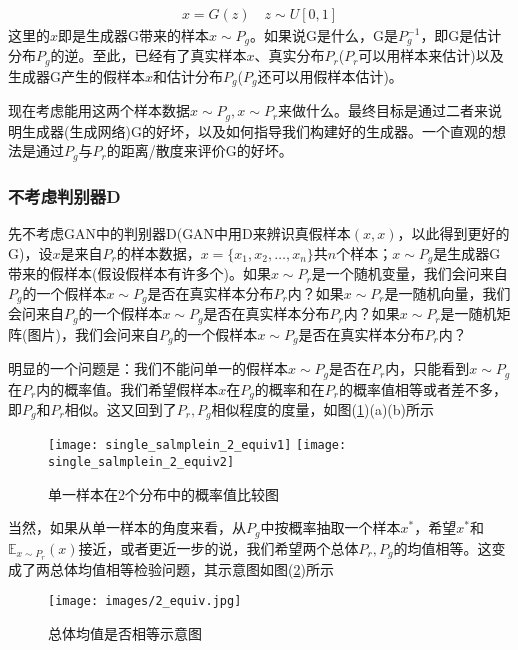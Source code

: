         \begin{align*}
        x = G(z)\quad z\sim U[0,1]
        \end{align*}
        这里的$x$即是生成器G带来的样本$x\sim P_g$。如果说G是什么，G是$P_g^{-1}$，即G是估计分布$P_g$的逆。至此，已经有了真实样本$x$、真实分布$P_r$($P_r$可以用样本来估计)以及生成器G产生的假样本$x$和估计分布$P_g$($P_g$还可以用假样本估计)。
        \par
        现在考虑能用这两个样本数据$x\sim P_g,x\sim P_r$来做什么。最终目标是通过二者来说明生成器(生成网络)G的好坏，以及如何指导我们构建好的生成器。一个直观的想法是通过$P_g$与$P_r$的距离/散度来评价G的好坏。
        \subsubsection{不考虑判别器D}
            \par
            先不考虑GAN中的判别器D(GAN中用D来辨识真假样本$(x,x)$，以此得到更好的G)，设$x$是来自$P_r$的样本数据，$x= \{x_1,x_2,\dots,x_n\}$共$n$个样本；$x\sim P_g$是生成器G带来的假样本(假设假样本有许多个)。如果$x\sim P_r$是一个随机变量，我们会问来自$P_g$的一个假样本$x\sim P_g$是否在真实样本分布$P_r$内？如果$x\sim P_r$是一随机向量，我们会问来自$P_g$的一个假样本$x\sim P_g$是否在真实样本分布$P_r$内？如果$x\sim P_r$是一随机矩阵(图片)，我们会问来自$P_g$的一个假样本$x\sim P_g$是否在真实样本分布$P_r$内？
            \par
            明显的一个问题是：我们不能问单一的假样本$x\sim P_g$是否在$P_r$内，只能看到$x\sim P_g$在$P_r$内的概率值。我们希望假样本$x$在$P_g$的概率和在$P_r$的概率值相等或者差不多，即$P_g$和$P_r$相似。这又回到了$P_r,P_g$相似程度的度量，如图(\ref{fig:单一样本在2个分布中的概率值比较图})(a)(b)所示
            \begin{figure}[H]
            \centering
            \texttt{[image: single\_salmplein\_2\_equiv1]}
            \qquad
            \texttt{[image: single\_salmplein\_2\_equiv2]}
            \caption{单一样本在2个分布中的概率值比较图}
            \label{fig:单一样本在2个分布中的概率值比较图}
            \end{figure}
            当然，如果从单一样本的角度来看，从$P_g$中按概率抽取一个样本$x^*$，希望$x^*$和$\mathbb{E}_{x\sim P_r}(x)$接近，或者更近一步的说，我们希望两个总体$P_r,P_g$的均值相等。这变成了两总体均值相等检验问题，其示意图如图(\ref{fig:2总体均值是否相等示意图})所示
                \begin{figure}[H]
                \centering
                \texttt{[image: images/2\_equiv.jpg]}
                \caption{总体均值是否相等示意图}
                \label{fig:2总体均值是否相等示意图}
                \end{figure}
